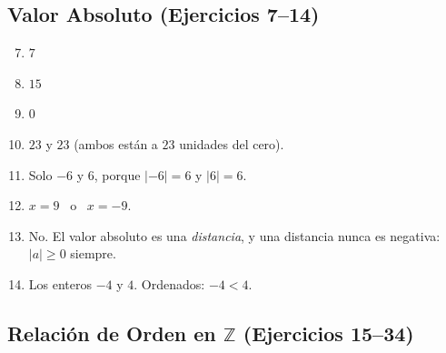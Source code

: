 \documentclass[12pt, letterpaper]{article}
\newcommand{\Z}{\mathbb{Z}}
\begin{document}
\subsection*{Valor Absoluto (Ejercicios 7--14)}

\begin{enumerate}[leftmargin=*, label=\textbf{\arabic*.}]
  \setcounter{enumi}{6}
  \item $7$
  \item $15$
  \item $0$
  \item $23$ y $23$ (ambos están a $23$ unidades del cero).
  \item Solo $-6$ y $6$, porque $|-6| = 6$ y $|6| = 6$.
  \item $x = 9$ \ o \ $x = -9$.
  \item No. El valor absoluto es una \emph{distancia}, y una distancia nunca es negativa: $|a| \ge 0$ siempre.
  \item Los enteros $-4$ y $4$. Ordenados: $-4 < 4$.
\end{enumerate}

\subsection*{Relación de Orden en $\Z$ (Ejercicios 15--34)}
\end{document}
